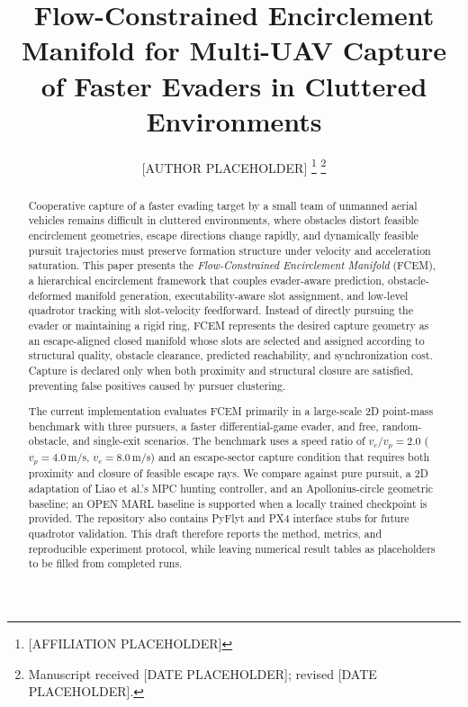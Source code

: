 \documentclass[journal]{IEEEtran}
\begin{document}
\title{Flow-Constrained Encirclement Manifold for Multi-UAV Capture of Faster Evaders in Cluttered Environments}

\author{[AUTHOR PLACEHOLDER]%
\thanks{[AFFILIATION PLACEHOLDER]}%
\thanks{Manuscript received [DATE PLACEHOLDER]; revised [DATE PLACEHOLDER].}}

\maketitle

\begin{abstract}
Cooperative capture of a faster evading target by a small team of unmanned aerial vehicles remains difficult in cluttered environments, where obstacles distort feasible encirclement geometries, escape directions change rapidly, and dynamically feasible pursuit trajectories must preserve formation structure under velocity and acceleration saturation.
This paper presents the \emph{Flow-Constrained Encirclement Manifold} (FCEM), a hierarchical encirclement framework that couples evader-aware prediction, obstacle-deformed manifold generation, executability-aware slot assignment, and low-level quadrotor tracking with slot-velocity feedforward.
Instead of directly pursuing the evader or maintaining a rigid ring, FCEM represents the desired capture geometry as an escape-aligned closed manifold whose slots are selected and assigned according to structural quality, obstacle clearance, predicted reachability, and synchronization cost.
Capture is declared only when both proximity and structural closure are satisfied, preventing false positives caused by pursuer clustering.

The current implementation evaluates FCEM primarily in a large-scale 2D point-mass benchmark with three pursuers, a faster differential-game evader, and free, random-obstacle, and single-exit scenarios.
The benchmark uses a speed ratio of $v_e/v_p = 2.0$ ($v_p=4.0$\,m/s, $v_e=8.0$\,m/s) and an escape-sector capture condition that requires both proximity and closure of feasible escape rays.
We compare against pure pursuit, a 2D adaptation of Liao et al.'s MPC hunting controller, and an Apollonius-circle geometric baseline; an OPEN MARL baseline is supported when a locally trained checkpoint is provided.
The repository also contains PyFlyt and PX4 interface stubs for future quadrotor validation.
This draft therefore reports the method, metrics, and reproducible experiment protocol, while leaving numerical result tables as placeholders to be filled from completed runs.
\end{abstract}
\end{document}
